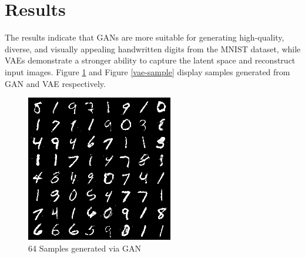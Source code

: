 \documentclass{article}
\begin{document}
\section{Results}
The results indicate that GANs are more suitable for generating high-quality, diverse, and visually appealing handwritten digits from the MNIST dataset, while VAEs demonstrate a stronger ability to capture the latent space and reconstruct input images. Figure \ref{gan-sample} and Figure \ref{vae-sample} display samples generated from GAN and VAE respectively.

\begin{figure}[ht]
\vskip 0.2in
\begin{center}
\centerline{\includegraphics[width=\columnwidth]{images/gan_sample.png}}
\caption{64 Samples generated via GAN}
\label{gan-sample}
\end{center}
\vskip -0.2in
\end{figure}
\end{document}
